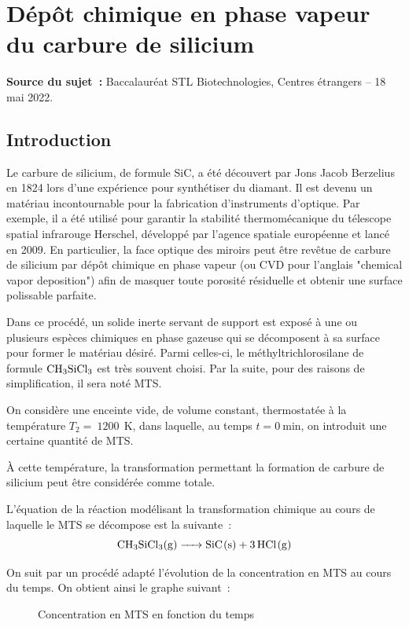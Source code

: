 \section{Dépôt chimique en phase vapeur du carbure de silicium}
\textbf{Source du sujet~:} Baccalauréat STL Biotechnologies, Centres étrangers – 18 mai 2022.

\subsection{Introduction}
Le carbure de silicium, de formule SiC, a été découvert par Jons Jacob Berzelius en 1824 lors d'une expérience pour synthétiser du diamant. Il est devenu un matériau incontournable pour la fabrication d'instruments d'optique. Par exemple, il a été utilisé pour garantir la stabilité thermomécanique du télescope spatial infrarouge Herschel, développé par l'agence spatiale européenne et lancé en 2009. En particulier, la face optique des miroirs peut être revêtue de carbure de silicium par dépôt chimique en phase vapeur (ou CVD pour l'anglais "chemical vapor deposition") afin de masquer toute porosité résiduelle et obtenir une surface polissable parfaite.

Dans ce procédé, un solide inerte servant de support est exposé à une ou plusieurs espèces chimiques en phase gazeuse qui se décomposent à sa surface pour former le matériau désiré. Parmi celles-ci, le méthyltrichlorosilane de formule $\ce{CH3SiCl3}$ est très souvent choisi. Par la suite, pour des raisons de simplification, il sera noté MTS.

\vspace{0.5cm}

On considère une enceinte vide, de volume constant, thermostatée à la température $T_{2} =~ \SI{1200}{~\kelvin}$, dans laquelle, au temps $t = \SI{0}{\minute}$, on introduit une certaine quantité de MTS.

À cette température, la transformation permettant la formation de carbure de silicium peut être considérée comme totale.

L'équation de la réaction modélisant la transformation chimique au cours de laquelle le MTS se décompose est la suivante~:
$$
\ce{CH3SiCl3(g) -> SiC(s) + 3HCl(g)}
$$

On suit par un procédé adapté l'évolution de la concentration en MTS au cours du temps. On obtient ainsi le graphe suivant~:

\begin{figure}[h]
    \centering
    \caption{Concentration en MTS en fonction du temps}
\end{figure}

